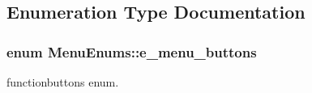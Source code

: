 \subsection{Enumeration Type Documentation}
\hypertarget{namespaceMenuEnums_a8a0112033fd82b21fb91024f2da815db}{
\subsubsection[{e\-\_\-menu\-\_\-buttons}]{\setlength{\rightskip}{0pt plus 5cm}enum {\bf Menu\-Enums\-::e\-\_\-menu\-\_\-buttons}}}\label{namespaceMenuEnums_a8a0112033fd82b21fb91024f2da815db}


functionbuttons enum. 

